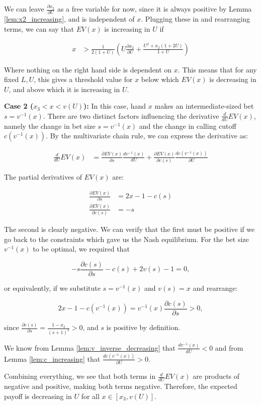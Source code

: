 \documentclass[../../main/main.tex]{subfiles}
\begin{document}
\begin{customproof}
    We can leave $\frac{\partial x_2}{\partial U}$ as a free variable for now, since it is always positive by Lemma \ref{lem:x2_increasing}, and is independent of $x$. Plugging these in and rearranging terms, we can say that $EV(x)$ is increasing in $U$ if 

    \begin{align*}
        x & > \frac{1}{2(1+U)} \left( U \frac{\partial x_2}{\partial U} + \frac{U^2 + x_2(1 + 2U)}{1+U} \right)
    \end{align*}

    Where nothing on the right hand side is dependent on $x$. This means that for any fixed $L, U$, this gives a threshold value for $x$ below which $EV(x)$ is decreasing in $U$, and above which it is increasing in $U$.

    \textbf{Case 2 ($x_3 < x < v(U)$):} In this case, hand $x$ makes an intermediate-sized bet $s = v^{-1}(x)$. There are two distinct factors influencing the derivative $\frac{d}{dU} EV(x)$, namely the change in bet size $s = v^{-1}(x)$ and the change in calling cutoff $c(v^{-1}(x))$. By the multivariate chain rule, we can express the derivative as:

    \begin{align*}
        \frac{d}{dU} EV(x) & = \frac{\partial EV(x)}{\partial s} \frac{d v^{-1}(x)}{d U} + \frac{\partial EV(x)}{\partial c(s)} \frac{d c(v^{-1}(x))}{\partial U}
    \end{align*}

    The partial derivatives of $EV(x)$ are:

    \begin{align*}
        \frac{\partial EV(x)}{\partial s} & = 2x - 1 - c(s) \\
        \frac{\partial EV(x)}{\partial c(s)} & = - s
    \end{align*}

    The second is clearly negative. We can verify that the first must be positive if we go back to the constraints which gave us the Nash equilibrium. For the bet size $v^{-1}(x)$ to be optimal, we required that 

    $$ -s \frac{\partial c(s)}{\partial s} - c(s) + 2v(s) - 1 = 0,$$

    or equivalently, if we substitute $s= v^{-1}(x)$ and $v(s) = x$ and rearrange:

    $$ 2x -1 -c(v^{-1}(x)) = v^{-1}(x) \frac{\partial c(s)}{\partial s} > 0,$$

    since $\frac{\partial c(s)}{\partial s} = \frac{1-x_2}{(s+1)^2} > 0$, and $s$ is positive by definition.

    We know from Lemma \ref{lem:v_inverse_decreasing} that $\frac{d v^{-1}(x)}{d U} < 0$ and from Lemma \ref{lem:c_increasing} that $\frac{d c(v^{-1}(x))}{\partial U} > 0$.

    Combining everything, we see that both terms in $\frac{d}{dU} EV(x)$ are products of negative and positive, making both terms negative. Therefore, the expected payoff is decreasing in $U$ for all $x \in [x_3, v(U)]$.

\end{customproof}
\end{document}
